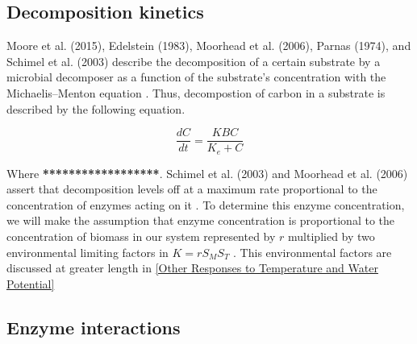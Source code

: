 \documentclass[12pt]{article}
\begin{document}
\begin{multicols}{2}
\subsection{Decomposition kinetics}
Moore et al. (2015), Edelstein (1983), Moorhead et al. (2006), Parnas (1974), and Schimel et al. (2003) describe the decomposition of a certain substrate by a microbial decomposer as a function of the substrate's concentration with the Michaelis–Menton equation \cite{Moore2015, Edelstein1983, Moorhead2006, Parnas1975, Schimel2003}. Thus, decompostion of carbon in a substrate is described by the following equation.

\begin{equation} \label{eq:3}
\frac{dC}{dt} = \frac{KBC}{K_{e}+C}
\end{equation}

Where \textbf{******************}. Schimel et al. (2003) and Moorhead et al. (2006) assert that decomposition levels off at a maximum rate proportional to the concentration of enzymes acting on it \cite{Schimel2003, Moorhead2006}. To determine this enzyme concentration, we will make the assumption that enzyme concentration is proportional to the concentration of biomass in our system represented by $r$ multiplied by two environmental limiting factors in $K=rS_{M}S_{T}$ \cite{Schimel2003}. This environmental factors are discussed at greater length in \ref{Other Responses to Temperature and Water Potential}

\subsection{Enzyme interactions}


\end{multicols}
\end{document}
